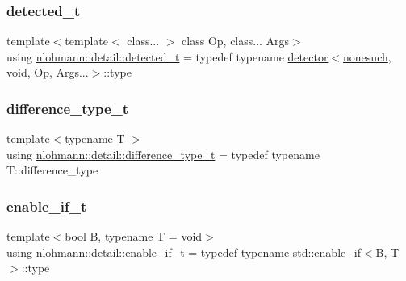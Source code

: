 \mbox{\label{namespacenlohmann_1_1detail_a37e97a32d0b94ce5f745427e4e40204d}} 
\subsubsection{\texorpdfstring{detected\_t}{detected\_t}}
{\footnotesize\ttfamily template$<$template$<$ class... $>$ class Op, class... Args$>$ \\
using \mbox{\hyperlink{namespacenlohmann_1_1detail_a37e97a32d0b94ce5f745427e4e40204d}{nlohmann\+::detail\+::detected\+\_\+t}} = typedef typename \mbox{\hyperlink{structnlohmann_1_1detail_1_1detector}{detector}}$<$\mbox{\hyperlink{structnlohmann_1_1detail_1_1nonesuch}{nonesuch}}, \mbox{\hyperlink{namespacenlohmann_1_1detail_a59fca69799f6b9e366710cb9043aa77d}{void}}, Op, Args...$>$\+::type}

\mbox{\label{namespacenlohmann_1_1detail_a3603b59a17d1c5e15050743b847992f2}} 
\subsubsection{\texorpdfstring{difference\_type\_t}{difference\_type\_t}}
{\footnotesize\ttfamily template$<$typename T $>$ \\
using \mbox{\hyperlink{namespacenlohmann_1_1detail_a3603b59a17d1c5e15050743b847992f2}{nlohmann\+::detail\+::difference\+\_\+type\+\_\+t}} = typedef typename T\+::difference\+\_\+type}

\mbox{\label{namespacenlohmann_1_1detail_a02bcbc878bee413f25b985ada771aa9c}} 
\subsubsection{\texorpdfstring{enable\_if\_t}{enable\_if\_t}}
{\footnotesize\ttfamily template$<$bool B, typename T  = void$>$ \\
using \mbox{\hyperlink{namespacenlohmann_1_1detail_a02bcbc878bee413f25b985ada771aa9c}{nlohmann\+::detail\+::enable\+\_\+if\+\_\+t}} = typedef typename std\+::enable\+\_\+if$<$\mbox{\hyperlink{_keyboard_event_8h_a9d3d9048db16a7eee539e93e3618cbe7}{B}}, \mbox{\hyperlink{_keyboard_event_8h_adf1f3edb9115acb0a1e04209b7a9937b}{T}}$>$\+::type}

